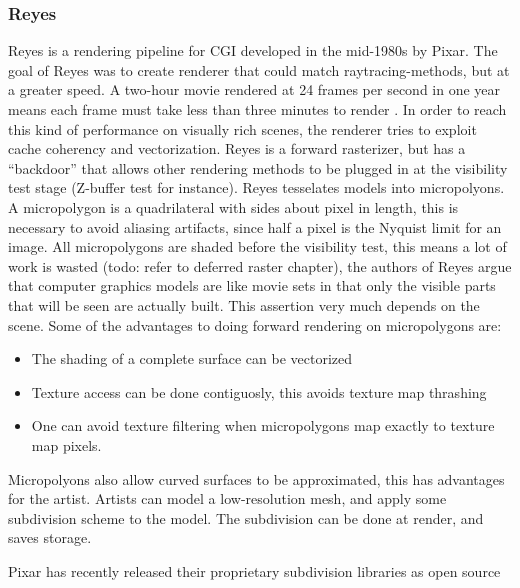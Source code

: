 \subsubsection {Reyes}
	\def\onequarter{\sfrac{1}{4}}
  \def\onehalf{\sfrac{1}{2}}
  
	Reyes is a rendering pipeline for CGI developed in the mid-1980s by Pixar. The goal of Reyes was to create renderer that could match raytracing-methods, but at a greater speed. A two-hour movie rendered at 24 frames per second in one year means each frame must take less than three minutes to render \cite{reyes1987}. In order to reach this kind of performance on visually rich scenes, the renderer tries to exploit cache coherency and vectorization. Reyes is a forward rasterizer, but has a ``backdoor'' that allows other rendering methods to be plugged in at the visibility test stage (Z-buffer test for instance). Reyes tesselates models into micropolyons. A micropolygon is a quadrilateral with sides about \onehalf pixel in length, this is necessary to avoid aliasing artifacts, since half a pixel is the Nyquist limit for an image. All micropolygons are shaded before the visibility test, this means a lot of work is wasted (todo: refer to deferred raster chapter), the authors of Reyes argue that computer graphics models are like movie sets in that only the visible parts that will be seen are actually built. This assertion very much depends on the scene. Some of the advantages to doing forward rendering on micropolygons are:
	
\begin{itemize}
	\item The shading of a complete surface can be vectorized
	\item Texture access can be done contiguosly, this avoids texture map thrashing
	\item One can avoid texture filtering when micropolygons map exactly to texture map pixels.
\end{itemize}
	
	Micropolyons also allow curved surfaces to be approximated, this has advantages for the artist. Artists can model a low-resolution mesh, and apply some subdivision scheme to the model. The subdivision can be done at render, and saves storage.
	
	Pixar has recently released their proprietary subdivision libraries as open source \cite{pixar_subdiv}
	
	
